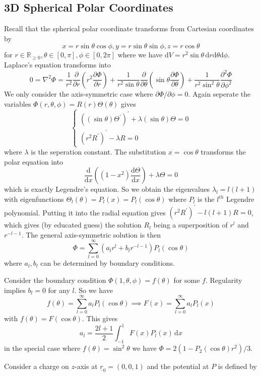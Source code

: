 \subsection{3D Spherical Polar Coordinates}
Recall that the spherical polar coordinate transforms from Cartesian coordinates by
$$x=r\sin\theta\cos\phi,y=r\sin\theta\sin\phi,z=r\cos\theta$$
for $r\in\mathbb R_{\ge 0},\theta\in [0,\pi],\phi\in[0,2\pi]$ where we have $\mathrm dV=r^2\sin\theta\,\mathrm dr\mathrm d\theta\mathrm d\phi$.
Laplace's equation transforms into
$$0=\nabla^2\Phi=\frac{1}{r^2}\frac{\partial}{\partial r}\left( r^2\frac{\partial\Phi}{\partial r} \right)+\frac{1}{r^2\sin\theta}\frac{\partial}{\partial\theta}\left( \sin\theta\frac{\partial\Phi}{\partial\theta} \right)+\frac{1}{r^2\sin^2\theta}\frac{\partial^2\Phi}{\partial\phi^2}$$
We only consider the axis-symmetric case where $\partial\Phi/\partial\phi=0$.
Again seperate the variables $\Phi(r,\theta,\phi)=R(r)\Theta(\theta)$ gives
$$\begin{cases}
    ((\sin\theta)\Theta^\prime)^\prime+\lambda(\sin\theta)\Theta=0\\
    (r^2R^\prime)^\prime-\lambda R=0
\end{cases}$$
where $\lambda$ is the seperation constant.
The substitution $x=\cos\theta$ transforms the polar equation into
$$\frac{\mathrm d}{\mathrm dx}\left( (1-x^2)\frac{\mathrm d\Theta}{\mathrm dx} \right)+\lambda\Theta=0$$
which is exactly Legendre's equation.
So we obtain the eigenvalues $\lambda_l=l(l+1)$ with eigenfunctions $\Theta_l(\theta)=P_l(x)=P_l(\cos\theta)$ where $P_l$ is the $l^{th}$ Legendre polynomial.
Putting it into the radial equation gives $(r^2R^\prime)^\prime-l(l+1)R=0$, which gives (by educated guess) the solution $R_l$ being a superposition of $r^l$ and $r^{-l-1}$.
The general axis-symmetric solution is then
$$\Phi=\sum_{l=0}^\infty(a_lr^l+b_lr^{-l-1})P_l(\cos\theta)$$
where $a_l,b_l$ can be determined by boundary conditions.
\begin{example}
    Consider the boundary condition $\Phi(1,\theta,\phi)=f(\theta)$ for some $f$.
    Regularity implies $b_l=0$ for any $l$.
    So we have
    $$f(\theta)=\sum_{l=0}^\infty a_lP_l(\cos\theta)\implies F(x)=\sum_{l=0}^\infty a_lP_l(x)$$
    with $f(\theta)=F(\cos\theta)$.
    This gives
    $$a_l=\frac{2l+1}{2}\int_{-1}^1F(x)P_l(x)\,\mathrm dx$$
    in the special case where $f(\theta)=\sin^2\theta$ we have $\Phi=2(1-P_2(\cos\theta)r^2)/3$.
\end{example}
Consider a charge on $z$-axis at $\underline{r}_0=(0,0,1)$ and the potential at $P$ is defined by
